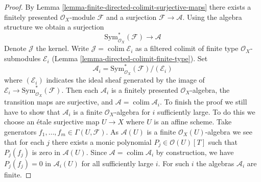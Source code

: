 \documentclass{stacks-project}
\theoremstyle{plain}
\theoremstyle{definition}
\theoremstyle{remark}
\numberwithin{equation}{subsection}
\def\colim{\mathop{\mathrm{colim}}\nolimits}
\begin{document}
\begin{proof}
By Lemma \ref{lemma-finite-directed-colimit-surjective-maps}
there exists a finitely presented $\mathcal{O}_X$-module
$\mathcal{F}$ and a surjection $\mathcal{F} \to \mathcal{A}$.
Using the algebra structure we obtain a surjection
$$
\text{Sym}^*_{\mathcal{O}_X}(\mathcal{F}) \longrightarrow \mathcal{A}
$$
Denote $\mathcal{J}$ the kernel. Write $\mathcal{J} = \colim \mathcal{E}_i$
as a filtered colimit of finite type $\mathcal{O}_X$-submodules
$\mathcal{E}_i$ (Lemma \ref{lemma-directed-colimit-finite-type}). Set
$$
\mathcal{A}_i = \text{Sym}^*_{\mathcal{O}_X}(\mathcal{F})/(\mathcal{E}_i)
$$
where $(\mathcal{E}_i)$ indicates the ideal sheaf generated by
the image of $\mathcal{E}_i \to \text{Sym}^*_{\mathcal{O}_X}(\mathcal{F})$.
Then each $\mathcal{A}_i$ is a finitely presented $\mathcal{O}_X$-algebra,
the transition maps are surjective, and $\mathcal{A} = \colim \mathcal{A}_i$.
To finish the proof we still
have to show that $\mathcal{A}_i$ is a finite $\mathcal{O}_X$-algebra
for $i$ sufficiently large. To do this we choose an \'etale surjective
map $U \to X$ where $U$ is an affine scheme. Take generators
$f_1, \ldots, f_m \in \Gamma(U, \mathcal{F})$.
As $\mathcal{A}(U)$ is a finite $\mathcal{O}_X(U)$-algebra we
see that for each $j$ there exists a monic polynomial
$P_j \in \mathcal{O}(U)[T]$ such that $P_j(f_j)$ is zero in $\mathcal{A}(U)$.
Since $\mathcal{A} = \colim \mathcal{A}_i$ by construction, we
have $P_j(f_j) = 0$ in $\mathcal{A}_i(U)$ for all sufficiently large $i$.
For such $i$ the algebras $\mathcal{A}_i$ are finite.
\end{proof}
\end{document}
